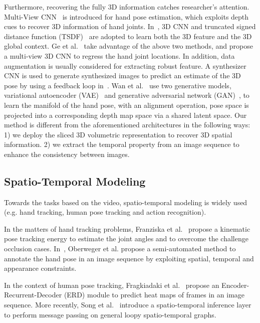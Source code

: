 \documentclass[journal,comsoc]{IEEEtran}
\begin{document}
Furthermore, recovering the fully 3D information catches researcher's attention. Multi-View
CNN~\cite{Ge_2016_CVPR} is introduced for hand pose estimation, which exploits depth cues to recover 3D
information of hand joints. In~\cite{deng2017hand3d}, 3D CNN and truncated signed
distance function (TSDF)~\cite{newcombe2011kinectfusion} are adopted to learn both the
3D feature and the 3D global context. Ge et al.~\cite{Ge_2017_CVPR} take advantage of the above
two methods, and propose a multi-view 3D CNN to regress the hand joint locations.
In addition, data augmentation is usually considered for extracting robust feature. A synthesizer
CNN is used to generate synthesized images to predict an estimate of the 3D pose by using a feedback
loop in~\cite{oberweger2015training}. Wan et al.~\cite{Wan_2017_CVPR} use two generative models,
variational autoencoder (VAE)~\cite{kingma2013auto} and generative adversarial network
(GAN)~\cite{goodfellow2014generative}, to learn the manifold of the hand pose, with an alignment
operation, pose space is projected into a corresponding depth map space via a shared latent
space. Our method is different from the aforementioned architectures in the following ways: 1) we
deploy the sliced 3D volumetric representation to recover 3D spatial information. 2) we extract the
temporal property from an image sequence to enhance the consistency between images.

\subsection{Spatio-Temporal Modeling}\label{sec:spatio-temporal modeling}
Towards the tasks based on the video, spatio-temporal modeling
is widely used (e.g. hand tracking, human pose tracking and action recognition).

In the matters of hand tracking problems, Franziska et al.~\mbox{\cite{mueller2017real}} propose a kinematic pose tracking energy to estimate the joint angles and to overcome the challenge occlusion cases. In~\mbox{\cite{oberweger2016efficiently}}, Oberweger et al. propose a semi-automated method to annotate the hand pose in an image sequence by exploiting spatial, temporal and appearance constraints.

In the context of human pose tracking,
Fragkiadaki et al.~\cite{fragkiadaki2015recurrent} propose an Encoder-Recurrent-Decoder (ERD)
module to predict heat maps of frames in an image sequence. More recently, Song et al.~\cite{Song_2017_CVPR}
introduce a spatio-temporal inference layer to perform message passing on general loopy spatio-temporal graphs.
\end{document}
